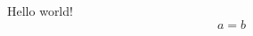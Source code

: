 \documentclass{article}
\begin{document}
Hello world!
\begin{equation*} 
a = b
\end{equation*}
\end{document}
